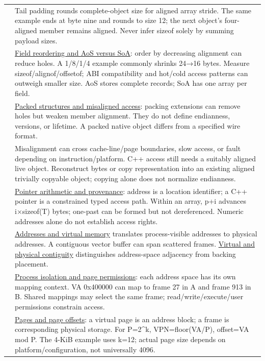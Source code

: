 {\begin{longtable}[]{@{}
  >{\raggedright\arraybackslash}p{}
  >{\raggedright\arraybackslash}p{}@{}}
47 & Tail padding rounds complete-object size for aligned array stride. The same example ends at byte nine and rounds to size 12; the next object's four-aligned member remains aligned. Never infer sizeof solely by summing payload sizes. \\
48 & \hyperref[appendix-5522ad176ca0]{Field reordering and AoS versus SoA}: order by decreasing alignment can reduce holes. A 1/8/1/4 example commonly shrinks 24→16 bytes. Measure sizeof/alignof/offsetof; ABI compatibility and hot/cold access patterns can outweigh smaller size. AoS stores complete records; SoA has one array per field. \\
49 & \hyperref[appendix-0682dbfc5f0e]{Packed structures and misaligned access}: packing extensions can remove holes but weaken member alignment. They do not define endianness, versions, or lifetime. A packed native object differs from a specified wire format. \\
50 & Misalignment can cross cache-line/page boundaries, slow access, or fault depending on instruction/platform. C++ access still needs a suitably aligned live object. Reconstruct bytes or copy representation into an existing aligned trivially copyable object; copying alone does not normalize endianness. \\
51 & \hyperref[appendix-6af5921bc853]{Pointer arithmetic and provenance}: address is a location identifier; a C++ pointer is a constrained typed access path. Within an array, p+i advances i×sizeof(T) bytes; one-past can be formed but not dereferenced. Numeric addresses alone do not establish access rights. \\
52 & \hyperref[appendix-18ee4f913c3c]{Addresses and virtual memory} translates process-visible addresses to physical addresses. A contiguous vector buffer can span scattered frames. \hyperref[appendix-f897c1ddac8f]{Virtual and physical contiguity} distinguishes address-space adjacency from backing placement. \\
53 & \hyperref[appendix-c2a9ad1e2b49]{Process isolation and page permissions}: each address space has its own mapping context. VA 0x400000 can map to frame 27 in A and frame 913 in B. Shared mappings may select the same frame; read/write/execute/user permissions constrain access. \\
54 & \hyperref[appendix-0c67cd5bf30a]{Pages and page offsets}: a virtual page is an address block; a frame is corresponding physical storage. For P=2\^{}k, VPN=floor(VA/P), offset=VA mod P. The 4-KiB example uses k=12; actual page size depends on platform/configuration, not universally 4096. \\

\end{longtable}}
